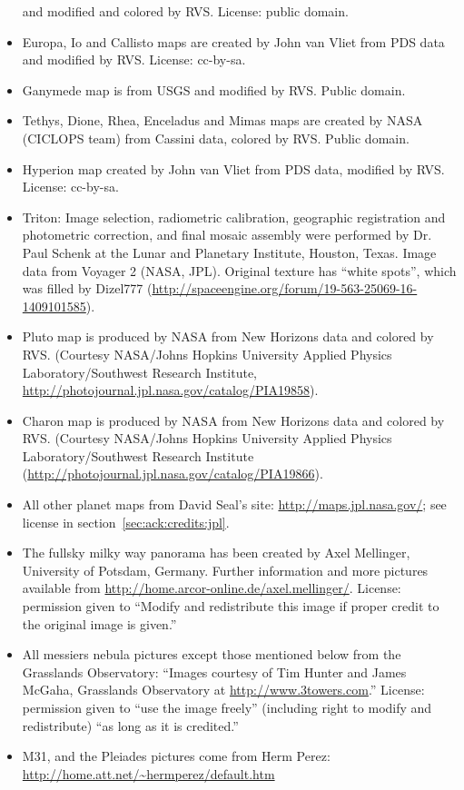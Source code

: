 \begin{itemize}
	  and modified and colored by RVS. License: public domain.
\item Europa, Io and Callisto maps are created by John van Vliet from PDS data and modified by RVS. License: cc-by-sa.
\item Ganymede map is from USGS and modified by RVS. Public domain.
\item Tethys, Dione, Rhea, Enceladus and Mimas maps are created by NASA (CICLOPS team) from Cassini data, colored by RVS. Public domain.
\item Hyperion map created by John van Vliet from PDS data, modified by RVS. License: cc-by-sa.
\item Triton: Image selection, radiometric calibration, geographic registration and photometric correction, and final mosaic assembly 
	  were performed by Dr. Paul Schenk at the Lunar and Planetary Institute, Houston, Texas. Image data from Voyager 2 (NASA, JPL).
	  Original texture has ``white spots'', which was filled by Dizel777 (\url{http://spaceengine.org/forum/19-563-25069-16-1409101585}).
\item Pluto map is produced by NASA from New Horizons data and colored by RVS. (Courtesy NASA/Johns Hopkins University Applied Physics
	  Laboratory/Southwest Research Institute, \url{http://photojournal.jpl.nasa.gov/catalog/PIA19858}).
\item Charon map is produced by NASA from New Horizons data and colored by RVS. (Courtesy NASA/Johns Hopkins University Applied Physics
	  Laboratory/Southwest Research Institute (\url{http://photojournal.jpl.nasa.gov/catalog/PIA19866}).
\item All other planet maps from David Seal's site: \url{http://maps.jpl.nasa.gov/}; see license in section~\ref{sec:ack:credits:jpl}.
\item The fullsky milky way panorama has been created by Axel Mellinger, University of Potsdam, Germany. 
      Further information and more pictures available from \url{http://home.arcor-online.de/axel.mellinger/}.
      License: permission given to ``Modify and redistribute this image if proper credit to the original image is given.''
\item All messiers nebula pictures except those mentioned below from the
	  Grasslands Observatory: ``Images courtesy of Tim Hunter and James McGaha, Grasslands Observatory at \url{http://www.3towers.com}.''
	  License: permission given to ``use the image freely'' (including right to modify and redistribute) ``as long as it is credited.''
\item M31, and the Pleiades pictures come from Herm Perez: \url{http://home.att.net/~hermperez/default.htm}

\end{itemize}
